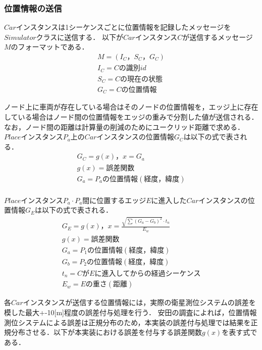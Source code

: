 \subsubsection{位置情報の送信}
\label{implementation-send-position}
$Car$インスタンスは1シーケンスごとに位置情報を記録したメッセージを$Simulator$クラスに送信する．
以下が$Car$インスタンス$C$が送信するメッセージ$M$のフォーマットである．
\begin{align}
	M = \left(I_C，S_C，G_C\right) \\
	I_C = Cの識別id               \\
	S_C = Cの現在の状態        \\
	G_C = Cの位置情報
\end{align}


ノード上に車両が存在している場合はそのノードの位置情報を，エッジ上に存在している場合はノード間の位置情報をエッジの重みで分割した値が送信される．なお，ノード間の距離は計算量の削減のためにユークリッド距離\cite{cluster-analysis}で求める．
$Place$インスタンス$P_a$上の$Car$インスタンスの位置情報$G_C$は以下の式で表される．
\begin{align}
	G_C = g(x)，x = G_a　                   \\
	g(x) = 誤差関数                       \\
	G_a = P_aの位置情報(経度，緯度) \\
\end{align}

$Place$インスタンス$P_a \cdot P_a$間に位置するエッジ$E$に進入した$Car$インスタンスの位置情報$G_E$は以下の式で表される．
\begin{align}
	G_E = g(x)，x = \frac{\sqrt{\sum{\left(G_a - G_b\right)^2}} \cdot t_n}{E_w} \\
	g(x) = 誤差関数                                                          \\
	G_a = P_1の位置情報(経度，緯度)                                    \\
	G_b = P_2の位置情報(経度，緯度)　                                 \\
	t_n = CがEに進入してからの経過シーケンス                     \\
	E_w = Eの重さ(距離)                                                     
\end{align}

各$Car$インスタンスが送信する位置情報には，実際の衛星測位システムの誤差\cite{gps-gov}を模した最大+-10[m]程度の誤差付与処理を行う．
安田の調査\cite{Yasuda}によれば，位置情報測位システムによる誤差は正規分布のため，本実装の誤差付与処理では結果を正規分布させる．以下が本実装における誤差を付与する誤差関数$g(x)$を表す式である．

